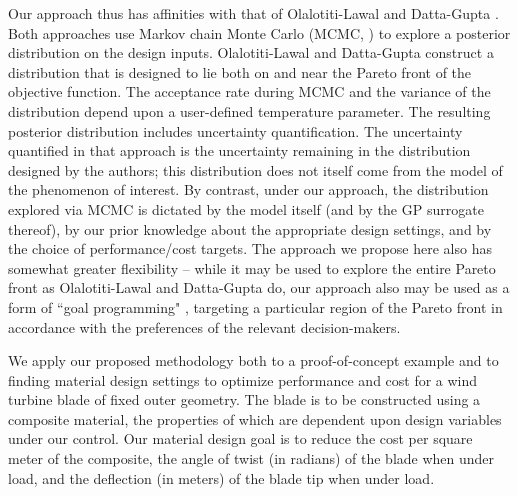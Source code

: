 \documentclass[twocolumn,10pt]{asme2ej}
\begin{document}
%
Our approach thus has affinities with that of Olalotiti-Lawal and Datta-Gupta \cite{Olalotiti-Lawal2015}.
%
Both approaches use Markov chain Monte Carlo (MCMC, \cite{Gelfand1990}) to explore a posterior distribution on the design inputs.
%
Olalotiti-Lawal and Datta-Gupta construct a distribution that is designed to lie both on and near the Pareto front of the objective function.
%
The acceptance rate during MCMC and the variance of the distribution depend upon a user-defined temperature parameter.
%
The resulting posterior distribution includes uncertainty quantification.
%
The uncertainty quantified in that approach is the uncertainty remaining in the distribution designed by the authors; this distribution does not itself come from the model of the phenomenon of interest.
%
By contrast, under our approach, the distribution explored via MCMC is dictated by the model itself (and by the GP surrogate thereof), by our prior knowledge about the appropriate design settings, and by the choice of performance/cost targets.
%
The approach we propose here also has somewhat greater flexibility -- while it may be used to explore the entire Pareto front as Olalotiti-Lawal and Datta-Gupta do, our approach also may be used as a form of ``goal programming" \cite{Miettinen2008}, targeting a particular region of the Pareto front in accordance with the preferences of the relevant decision-makers.
%

%
We apply our proposed methodology both to a proof-of-concept example and to finding material design settings to optimize performance and cost for a wind turbine blade of fixed outer geometry.
%
The blade is to be constructed using a composite material, the properties of which are dependent upon design variables under our control.
%
%
Our material design goal is to reduce the cost per square meter of the composite, the angle of twist (in radians) of the blade when under load, and the deflection (in meters) of the blade tip when under load.
%
\end{document}

